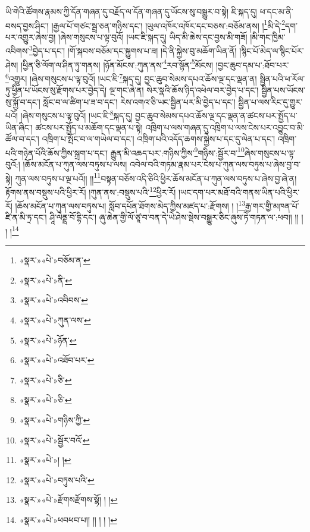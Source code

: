 ཡི་གེའི་ཚོགས་རྣམས་ཀྱི་དོན་གཞན་དུ་བརྗོད་ལ་དོན་གཞན་དུ་ཡོངས་སུ་བསྒྱུར་བ་སྟེ། ཇི་སྐད་དུ། ཕ་དང་མ་ནི་བསད་བྱས་ཤིང་། །རྒྱལ་པོ་གཙང་སྦྲ་ཅན་གཉིས་དང་། །ཡུལ་འཁོར་འཁོར་དང་བཅས་:བཅོམ་ནས། །\footnote{«སྣར་»«པེ་»བཅོམ་ན་}མི་དེ་\footnote{«སྣར་»«པེ་»ནི་}དག་པར་འགྱུར་ཞེས་བྱ། །ཞེས་གསུངས་པ་ལྟ་བུའོ། །ཡང་ཇི་སྐད་དུ། ཡིད་མི་ཆེས་དང་བྱས་མི་གཟོ། །མི་གང་ཁྱིམ་འབིགས་\footnote{«སྣར་»«པེ་»འབིབས་}བྱེད་པ་དང་། །གོ་སྐབས་བཅོམ་དང་སྐྱུགས་པ་ཟ། །དེ་ནི་སྐྱེས་བུ་མཆོག་ཡིན་ནོ། །སྙིང་པོ་མེད་ལ་སྙིང་པོར་ཤེས། །ཕྱིན་ཅི་ལོག་ལ་ཤིན་ཏུ་གནས། །ཉོན་མོངས་:ཀུན་ནས་\footnote{«སྣར་»«པེ་»ཀུན་ལས་}རབ་སྙོན་\footnote{«སྣར་»«པེ་»ཉོན་}མོངས། །བྱང་ཆུབ་དམ་པ་:ཐོབ་པར་\footnote{«སྣར་»«པེ་»འཐོབ་པར་}འགྱུར། །ཞེས་གསུངས་པ་ལྟ་བུའོ། །ཡང་ཇི་\footnote{«སྣར་»«པེ་»ཅི་}སྐད་དུ། བྱང་ཆུབ་སེམས་དཔའ་ཆོས་ལྔ་དང་ལྡན་ན། སྦྱིན་པའི་ཕ་རོལ་ཏུ་ཕྱིན་པ་ཡོངས་སུ་རྫོགས་པར་བྱེད་དེ། ལྔ་གང་ཞེ་ན། སེར་སྣའི་ཆོས་ཉིད་འཕེལ་བར་བྱེད་པ་དང་། སྦྱིན་པས་ཡོངས་སུ་སྐྱོ་བ་དང་། སློང་བ་ལ་ཚིག་པ་ཟ་བ་དང་། རེས་འགའ་ཅི་ཡང་སྦྱིན་པར་མི་བྱེད་པ་དང་། སྦྱིན་པ་ལས་རིང་དུ་གྱུར་པའོ། །ཞེས་གསུངས་པ་ལྟ་བུའོ། །ཡང་ཇི་\footnote{«སྣར་»«པེ་»ཅི་}སྐད་དུ། བྱང་ཆུབ་སེམས་དཔའ་ཆོས་ལྔ་དང་ལྡན་ན་ཚངས་པར་སྤྱོད་པ་ཡིན་ཞིང་། ཚངས་པར་སྤྱོད་པ་མཆོག་དང་ལྡན་པ་སྟེ། འཁྲིག་པ་ལས་གཞན་དུ་འཁྲིག་པ་ལས་ངེས་པར་འབྱུང་བ་མི་ཚོལ་བ་དང་། འཁྲིག་པ་སྤོང་བ་ལ་གཡེལ་བ་དང་། འཁྲིག་པའི་འདོད་ཆགས་སྐྱེས་པ་དང་དུ་ལེན་པ་དང་། འཁྲིག་པའི་གཉེན་པོའི་ཆོས་ཀྱིས་སྐྲག་པ་དང་། རྒྱུན་མི་འཆད་པར་:གཉིས་ཀྱིས་\footnote{«སྣར་»«པེ་»གཉིས་ཀྱི་}གཉིས་:སྦྱོར་བ་\footnote{«སྣར་»«པེ་»སྦྱོར་བའོ་}ཞེས་གསུངས་པ་ལྟ་བུའོ:། །ཆོས་མངོན་པ་ཀུན་ལས་བཏུས་པ་ལས། འབེལ་བའི་གཏམ་རྣམ་པར་ངེས་པ་ཀུན་ལས་བཏུས་པ་ཞེས་བྱ་བ་སྟེ། ཀུན་ལས་བཏུས་པ་ལྔ་པའོ།། །།\footnote{«སྣར་»«པེ་»། །}བསྟན་བཅོས་འདི་ཅིའི་ཕྱིར་ཆོས་མངོན་པ་ཀུན་ལས་བཏུས་པ་ཞེས་བྱ་ཞེ་ན། རྟོགས་ནས་བསྡུས་པའི་ཕྱིར་རོ། །ཀུན་ནས་:བསྡུས་པའི་\footnote{«སྣར་»«པེ་»བཏུས་པའི་}ཕྱིར་རོ། །ཡང་དག་པར་མཐོ་བའི་གནས་ཡིན་པའི་ཕྱིར་རོ། །ཆོས་མངོན་པ་ཀུན་ལས་བཏུས་པ། སློབ་དཔོན་ཐོགས་མེད་ཀྱིས་མཛད་པ་:རྫོགས། ། །\footnote{«སྣར་»«པེ་»རྫོགསརྫོགས་སྷོ། ། །}རྒྱ་གར་གྱི་མཁན་པོ་ཛི་ན་མི་ཏྲ་དང་། ཤཱི་ལེནྡྲ་བོ་དྷི་དང་། ཞུ་ཆེན་གྱི་ལོ་ཙཱ་བ་བན་དེ་ཡེ་ཤེས་སྡེས་བསྒྱུར་ཅིང་ཞུས་ཏེ་གཏན་ལ་:ཕབ།། །། ། ། །\footnote{«སྣར་»«པེ་»ཕབཕབ་པ།། །། ། ། །}
